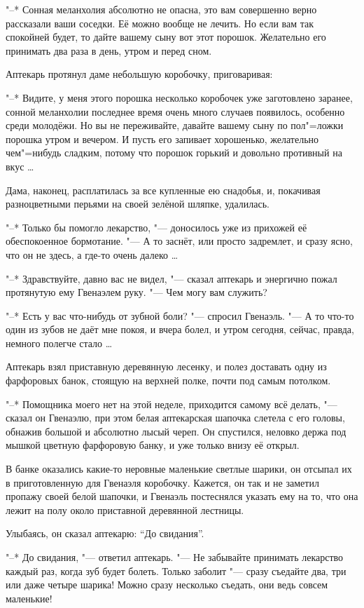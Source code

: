 "--* Сонная меланхолия абсолютно не опасна, это вам совершенно верно рассказали
ваши соседки.
Её можно вообще не лечить.
Но если вам так спокойней будет, то дайте вашему сыну вот этот порошок.
Желательно его принимать два раза в день, утром и перед сном.

Аптекарь протянул даме небольшую коробочку, приговаривая:

"--* Видите, у меня этого порошка несколько коробочек уже заготовлено заранее,
сонной меланхолии последнее время очень много случаев появилось, особенно среди
молодёжи.
Но вы не переживайте, давайте вашему сыну по пол"=ложки порошка утром и
вечером.
И пусть его запивает хорошенько, желательно чем"=нибудь сладким, потому что
порошок горький и довольно противный на вкус \ldots

Дама, наконец, расплатилась за все купленные ею снадобья, и, покачивая
разноцветными перьями на своей зелёной шляпке, удалилась.

"--* Только бы помогло лекарство, "--- доносилось уже из прихожей её
обеспокоенное бормотание.
"--- А то заснёт, или просто задремлет, и сразу ясно, что он не здесь, а где-то
очень далеко \ldots

"--* Здравствуйте, давно вас не видел, "--- сказал аптекарь и энергично пожал
протянутую ему Гвенаэлем руку.
"--- Чем могу вам служить?

"--* Есть у вас что-нибудь от зубной боли? "--- спросил Гвенаэль.
"--- А то что-то один из зубов не даёт мне покоя, и вчера болел, и утром сегодня,
сейчас, правда, немного полегче стало \ldots

Аптекарь взял приставную деревянную лесенку, и полез доставать одну из
фарфоровых банок, стоящую на верхней полке, почти под самым потолком.

"--* Помощника моего нет на этой неделе, приходится самому всё делать, "---
сказал он Гвенаэлю, при этом белая аптекарская шапочка слетела с его головы,
обнажив большой и абсолютно лысый череп.
Он спустился, неловко держа под мышкой цветную фарфоровую банку, и уже только
внизу её открыл.

В банке оказались какие-то неровные маленькие светлые шарики, он отсыпал их в
приготовленную для Гвенаэля коробочку.
Кажется, он так и не заметил пропажу своей белой шапочки, и Гвенаэль постеснялся
указать ему на то, что она лежит на полу около приставной деревянной лестницы.

Улыбаясь, он сказал аптекарю: \enquote{До свидания}.

"--* До свидания, "--- ответил аптекарь.
"--- Не забывайте принимать лекарство каждый раз, когда зуб будет болеть.
Только заболит "--- сразу съедайте два, три или даже четыре шарика!
Можно сразу несколько съедать, они ведь совсем маленькие!

